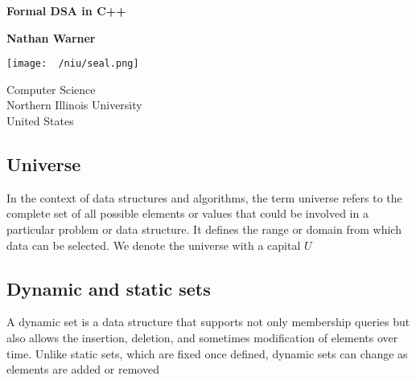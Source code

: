 \documentclass{report}
\title{\Huge{}}
\author{\huge{Nathan Warner}}
\date{\huge{}}
\begin{document}
        \begin{titlepage}
       \begin{center}
           \vspace*{1cm}
    
           \textbf{Formal DSA in C++}
    
           \vspace{0.5cm}
            
                
           \vspace{1.5cm}
    
           \textbf{Nathan Warner}
    
           \vfill
                
                
           \vspace{0.8cm}
         
           \texttt{[image: ~/niu/seal.png]}
                
           Computer Science \\
           Northern Illinois University\\
           United States\\
           
                
       \end{center}
    \end{titlepage}
    \tableofcontents
    \pagebreak 
    \bigbreak \noindent 
    \subsection{Universe}
    \bigbreak \noindent 
    In the context of data structures and algorithms, the term universe refers to the complete set of all possible elements or values that could be involved in a particular problem or data structure. It defines the range or domain from which data can be selected. We denote the universe with a capital $U$

    \bigbreak \noindent 
    \subsection{Dynamic and static sets}
    \bigbreak \noindent 
    A dynamic set is a data structure that supports not only membership queries but also allows the insertion, deletion, and sometimes modification of elements over time. Unlike static sets, which are fixed once defined, dynamic sets can change as elements are added or removed
\end{document}
